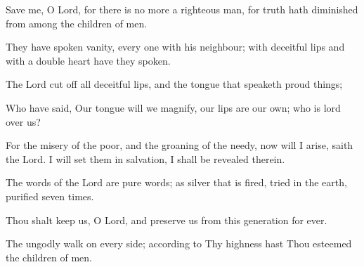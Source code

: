 Save me, O Lord, for there is no more a righteous man, for truth hath diminished from among the children of men.

They have spoken vanity, every one with his neighbour; with deceitful lips and with a double heart have they spoken.

The Lord cut off all deceitful lips, and the tongue that speaketh proud things;

Who have said, Our tongue will we magnify, our lips are our own; who is lord over us?

For the misery of the poor, and the groaning of the needy, now will I arise, saith the Lord. I will set them in salvation, I shall be revealed therein.

The words of the Lord are pure words; as silver that is fired, tried in the earth, purified seven times.

Thou shalt keep us, O Lord, and preserve us from this generation for ever.

The ungodly walk on every side; according to Thy highness hast Thou esteemed the children of men.
